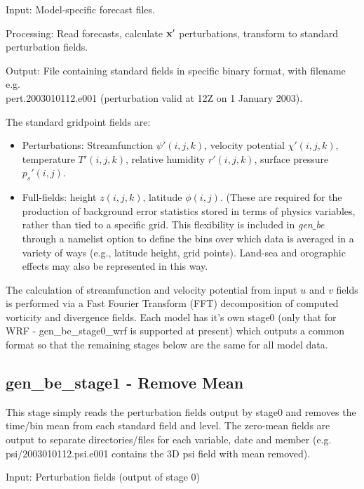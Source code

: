 Input: Model-specific forecast files.

Processing: Read forecasts, calculate ${\bf x'}$ perturbations, transform to standard perturbation fields.

Output: File containing standard fields in specific binary format, with filename e.g. \\pert.2003010112.e001 (perturbation valid at 12Z on 1 January 2003).

The standard gridpoint fields are:

\begin{itemize}\setlength{\parskip}{-4pt}
\item
 	Perturbations: Streamfunction $\psi'(i,j,k)$, velocity potential $\chi'(i,j,k)$, 
temperature $T'(i,j,k)$, relative humidity $r'(i,j,k)$, surface pressure $p_s'(i,j)$.

\item
 	Full-fields: height $z(i,j,k)$, latitude $\phi(i,j)$. (These are required for the 
production of background error statistics stored in terms of physics variables, 
rather than tied to a specific grid. This flexibility is included in {\it gen$\_$be} through a 
namelist option to define the bins over which data is averaged in a variety of ways 
(e.g., latitude height, grid points). Land-sea and orographic effects may also be 
represented in this way.
\end{itemize}

The calculation of streamfunction and velocity potential from input $u$ and $v$ fields is performed via a Fast Fourier Transform (FFT) decomposition of computed vorticity and divergence fields. Each model has it's own stage0 (only that for WRF - gen\_be\_stage0\_wrf is supported at present) which outputs a common format so that the remaining stages below are the same for all model data.


\subsection{gen\_be\_stage1 - Remove Mean}



This stage simply reads the perturbation fields output by stage0 and removes the time/bin mean from each standard field and level. The zero-mean fields are output to separate directories/files for each variable, date and member (e.g. psi/2003010112.psi.e001 contains the 3D psi field with mean removed).

Input: Perturbation fields (output of stage 0)

